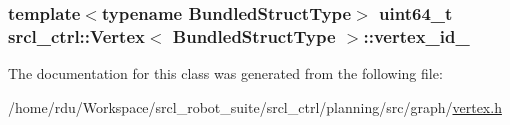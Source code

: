 \hypertarget{classsrcl__ctrl_1_1Vertex_abed4bbf25b9b223c24bc2e3a1cc2016a}{
\subsubsection[{vertex\-\_\-id\-\_\-}]{\setlength{\rightskip}{0pt plus 5cm}template$<$typename Bundled\-Struct\-Type$>$ uint64\-\_\-t {\bf srcl\-\_\-ctrl\-::\-Vertex}$<$ Bundled\-Struct\-Type $>$\-::vertex\-\_\-id\-\_\-}}\label{classsrcl__ctrl_1_1Vertex_abed4bbf25b9b223c24bc2e3a1cc2016a}


The documentation for this class was generated from the following file\-:\begin{DoxyCompactItemize}
\item 
/home/rdu/\-Workspace/srcl\-\_\-robot\-\_\-suite/srcl\-\_\-ctrl/planning/src/graph/\hyperlink{vertex_8h}{vertex.\-h}\end{DoxyCompactItemize}
